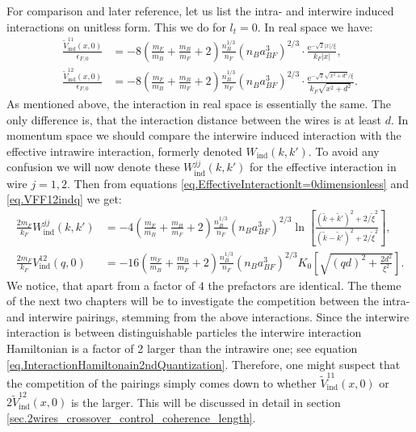 For comparison and later reference, let us list the intra- and interwire induced interactions on unitless form. This we do for $l_t = 0$. In real space we have:
\begin{align}
\frac{\tilde{V}_{\text{ind}}^{11}(x,0)}{\epsilon_{F,0}} &= - 8\left( \frac{m_F}{m_B} + \frac{m_B}{m_F} + 2 \right) \frac{n_B^{1/3}}{n_F}(n_Ba_{BF}^3)^{2/3} \cdot \frac{\text{e}^{ -\sqrt{2}|x| / \xi } }{k_F|x|}, \nonumber \\
\frac{\tilde{V}_{\text{ind}}^{12}(x,0)}{\epsilon_{F,0}} &= - 8\left( \frac{m_F}{m_B} + \frac{m_B}{m_F} + 2 \right) \frac{n_B^{1/3}}{n_F}(n_Ba_{BF}^3)^{2/3} \cdot \frac{\text{e}^{ - \sqrt{2}\sqrt{x^2 + d^2} /\xi } }{k_F\sqrt{x^2 + d^2}}. 
\end{align}
As mentioned above, the interaction in real space is essentially the same. The only difference is, that the interaction distance between the wires is at least $d$. In momentum space we should compare the interwire induced interaction with the effective intrawire interaction, formerly denoted $W_{\text{ind}}(k,k')$. To avoid any confusion we will now denote these $W_{\text{ind}}^{jj}(k,k')$ for the effective interaction in wire $j = 1, 2$. Then from equations \eqref{eq.EffectiveInteractionlt=0dimensionless} and \eqref{eq.VFF12indq} we get:
\begin{align}
\frac{2m_F}{k_F} W_{\text{ind}}^{jj}(k,k') &= - 4\left( \frac{m_F}{m_B} + \frac{m_B}{m_F} + 2 \right) \frac{n_B^{1/3}}{n_F}(n_Ba_{BF}^3)^{2/3} \ln\left[\frac{(\tilde{k}+\tilde{k}')^2+2/\tilde{\xi}^2}{(\tilde{k}-\tilde{k}')^2+2/\tilde{\xi}^2}\right], \nonumber \\
\frac{2m_F}{k_F} V_{\text{ind}}^{12}(q,0) &= - 16\left( \frac{m_F}{m_B} + \frac{m_B}{m_F} + 2 \right) \frac{n_B^{1/3}}{n_F}(n_Ba_{BF}^3)^{2/3}K_0\left[\sqrt{(qd)^2+\frac{2d^2}{\xi^2}}\right].
\end{align}
We notice, that apart from a factor of $4$ the prefactors are identical. The theme of the next two chapters will be to investigate the competition between the intra- and interwire pairings, stemming from the above interactions. Since the interwire interaction is between distinguishable particles the interwire interaction Hamiltonian is a factor of 2 larger than the intrawire one; see equation \eqref{eq.InteractionHamiltonain2ndQuantization}. Therefore, one might suspect that the competition of the pairings simply comes down to whether $\tilde{V}_{\text{ind}}^{11}(x,0)$ or $2\tilde{V}_{\text{ind}}^{12}(x,0)$ is the larger. This will be discussed in detail in section \ref{sec.2wires_crossover_control_coherence_length}. 




